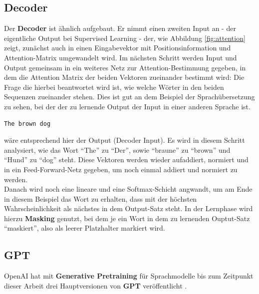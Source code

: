 \subsection*{Decoder}
Der \textbf{Decoder} ist \"ahnlich aufgebaut. Er nimmt einen zweiten Input an - der eigentliche Output bei Supervised Learning - der, wie Abbildung \ref{fig:attention} zeigt, zun\"achst auch in einen Eingabevektor mit Positionsinformation und Attention-Matrix umgewandelt wird. Im n\"achsten Schritt werden Input und Output gemeinsam in ein weiteres Netz zur Attention-Bestimmung gegeben, in dem die Attention Matrix der beiden Vektoren zueinander bestimmt wird: Die Frage die hierbei beantwortet wird ist, wie welche W\"orter in den beiden Sequenzen zueinander stehen. Dies ist gut an dem Beispiel der Sprach\"ubersetzung zu sehen, bei der der zu lernende Output der Input in einer anderen Sprache ist.
\begin{verbatim} 
The brown dog
\end{verbatim} 
w\"are entsprechend hier der Output (Decoder Input). Es wird in diesem Schritt analysiert, wie das Wort "`The"' zu "`Der"', sowie "`braune"' zu "`brown"' und "`Hund"' zu "`dog"' steht.
Diese Vektoren werden wieder aufaddiert, normiert und in ein Feed-Forward-Netz gegeben, um noch einmal addiert und normiert zu werden.\\
Danach wird noch eine lineare und eine Softmax-Schicht angwandt, um am Ende in diesem Beispiel das Wort zu erhalten, dass mit der h\"ochsten Wahrscheinlichkeit als n\"achstes in dem Output-Satz steht. In der Lernphase wird hierzu \textbf{Masking} genutzt, bei dem je ein Wort in dem zu lernenden Ouptut-Satz "`maskiert"', also als leerer Platzhalter markiert wird.


\subsection{GPT}
OpenAI hat mit \textbf{Generative Pretraining} f\"ur Sprachmodelle bis zum Zeitpunkt dieser Arbeit drei Hauptversionen von \textbf{GPT} ver\"offentlicht \cite{gpt}\cite{gpt2}\cite{gpt3}.\\

